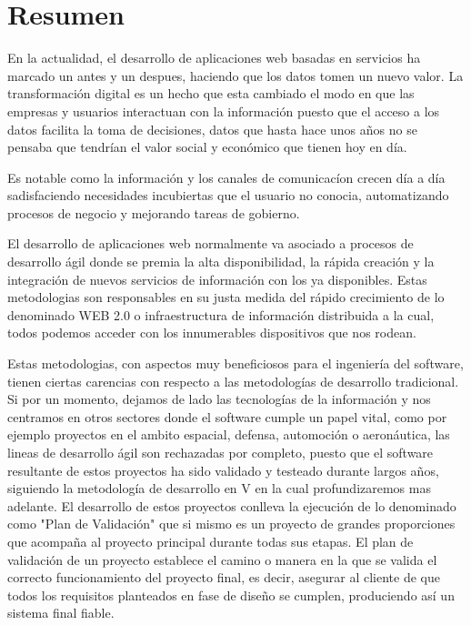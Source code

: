 \documentclass[a4paper,11pt]{book}
\begin{document}


\tableofcontents
\listoffigures

%

%


\chapter{Resumen}

En la actualidad, el desarrollo de aplicaciones web basadas en servicios ha marcado un antes y un despues, haciendo que los datos tomen un nuevo valor. La transformación digital es un hecho que esta cambiado el modo en que las empresas y usuarios interactuan con la información puesto que el acceso a los datos facilita la toma de decisiones, datos que hasta hace unos años no se pensaba que tendrían el valor social y económico que tienen hoy en día.

Es notable como la información y los canales de comunicacíon crecen día a día sadisfaciendo necesidades incubiertas que el usuario no conocia, automatizando procesos de negocio y mejorando tareas de gobierno.  

El desarrollo de aplicaciones web normalmente va asociado a procesos de desarrollo ágil donde se premia la alta disponibilidad, la rápida creación y la integración de nuevos servicios de información con los ya disponibles. Estas metodologias son responsables en su justa medida del rápido crecimiento de lo denominado WEB 2.0 o infraestructura de información distribuida a la cual, todos podemos acceder con los innumerables dispositivos que nos rodean. 

Estas metodologias, con aspectos muy beneficiosos para el ingeniería del software, tienen ciertas carencias con respecto a las metodologías de desarrollo tradicional. Si por un momento, dejamos de lado las tecnologías de la información y nos centramos en otros sectores  donde el software cumple un papel vital, como por ejemplo proyectos en el ambito espacial, defensa, automoción o aeronáutica, las lineas de desarrollo ágil son rechazadas por completo, puesto que el software resultante de estos proyectos ha sido validado y testeado durante largos años, siguiendo la metodología de desarrollo en V en la cual profundizaremos mas adelante. El desarrollo de estos proyectos conlleva la ejecución de lo denominado como "Plan de Validación" que si mismo es un proyecto de grandes proporciones que acompaña al proyecto principal durante todas sus etapas. El plan de validación de un proyecto establece el camino o manera en la que se valida el correcto funcionamiento del proyecto final, es decir, asegurar al cliente de que todos los requisitos planteados en fase de diseño se cumplen, produciendo así un sistema final fiable. 
\end{document}
